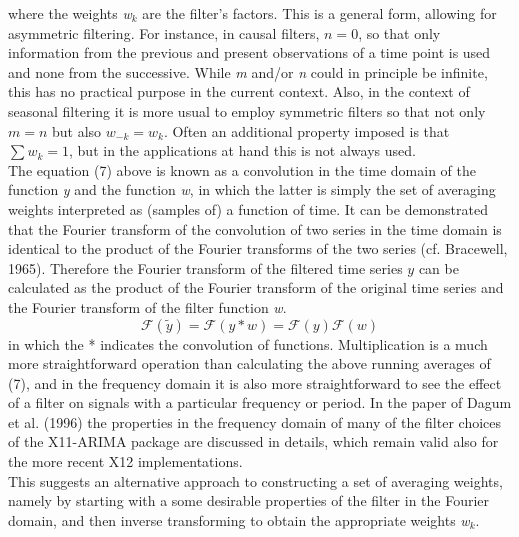 \documentclass{article}
\begin{document}
where the weights \textit{w$_k$} are the filter’s factors. This is a general form, allowing for asymmetric filtering. For instance, in causal filters, $n=0$, so that only information from the previous and present observations of a time point is used and none from the successive. While \textit{m} and/or \textit{n} could in principle be infinite, this has no practical purpose in the current context. Also, in the context of seasonal filtering it is more usual to employ symmetric filters so that not only $m=n$ but also $w_{-k} = w_k$. Often an additional property imposed is that $\sum w_k = 1$, but in the applications at hand this is not always used. \\ The equation (7) above is known as a convolution in the time domain of the function \textit{y} and the function \textit{w}, in which the latter is simply the set of averaging weights interpreted as (samples of) a function of time. It can be demonstrated that the Fourier transform of the convolution of two series in the time domain is identical to the product of the Fourier transforms of the two series (cf. Bracewell, 1965). Therefore the Fourier transform of the filtered time series $\textit{\~ y}$ can be calculated as the product of the Fourier transform of the original time series and the Fourier transform of the filter function \textit{w}.
\begin{equation}
\mathcal{F}(\tilde {y}) = \mathcal{F}(y * w) = \mathcal{F}(y)\mathcal{F}(w)
\end{equation}
in which the * indicates the convolution of functions. Multiplication is a much more straightforward operation than calculating the above running averages of (7), and in the frequency domain it is also more straightforward to see the effect of a filter on signals with a particular frequency or period. In the paper of Dagum et al. (1996) the properties in the frequency domain of many of the filter choices of the X11-ARIMA package are discussed in details, which remain valid also for the more recent X12 implementations.\\ This suggests an alternative approach to constructing a set of averaging weights, namely by starting with a some desirable properties of the filter in the Fourier domain, and then inverse transforming to obtain the appropriate weights \textit{w$_k$}.
\end{document}
